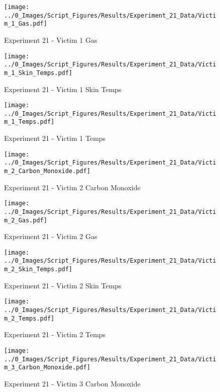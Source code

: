 	\begin{figure}[H]
		\centering
		\texttt{[image: ../0\_Images/Script\_Figures/Results/Experiment\_21\_Data/Victim\_1\_Gas.pdf]}
		\caption[]{Experiment 21 - Victim 1 Gas}
	\end{figure}
 
	\clearpage

	\begin{figure}[H]
		\centering
		\texttt{[image: ../0\_Images/Script\_Figures/Results/Experiment\_21\_Data/Victim\_1\_Skin\_Temps.pdf]}
		\caption[]{Experiment 21 - Victim 1 Skin Temps}
	\end{figure}
 

	\begin{figure}[H]
		\centering
		\texttt{[image: ../0\_Images/Script\_Figures/Results/Experiment\_21\_Data/Victim\_1\_Temps.pdf]}
		\caption[]{Experiment 21 - Victim 1 Temps}
	\end{figure}
 
	\clearpage

	\begin{figure}[H]
		\centering
		\texttt{[image: ../0\_Images/Script\_Figures/Results/Experiment\_21\_Data/Victim\_2\_Carbon\_Monoxide.pdf]}
		\caption[]{Experiment 21 - Victim 2 Carbon Monoxide}
	\end{figure}
 

	\begin{figure}[H]
		\centering
		\texttt{[image: ../0\_Images/Script\_Figures/Results/Experiment\_21\_Data/Victim\_2\_Gas.pdf]}
		\caption[]{Experiment 21 - Victim 2 Gas}
	\end{figure}
 
	\clearpage

	\begin{figure}[H]
		\centering
		\texttt{[image: ../0\_Images/Script\_Figures/Results/Experiment\_21\_Data/Victim\_2\_Skin\_Temps.pdf]}
		\caption[]{Experiment 21 - Victim 2 Skin Temps}
	\end{figure}
 

	\begin{figure}[H]
		\centering
		\texttt{[image: ../0\_Images/Script\_Figures/Results/Experiment\_21\_Data/Victim\_2\_Temps.pdf]}
		\caption[]{Experiment 21 - Victim 2 Temps}
	\end{figure}
 
	\clearpage

	\begin{figure}[H]
		\centering
		\texttt{[image: ../0\_Images/Script\_Figures/Results/Experiment\_21\_Data/Victim\_3\_Carbon\_Monoxide.pdf]}
		\caption[]{Experiment 21 - Victim 3 Carbon Monoxide}
	\end{figure}
 

